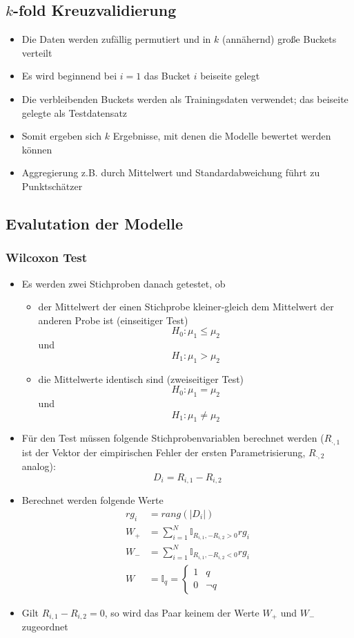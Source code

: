 \documentclass{scrartcl}
\begin{document}
\subsection{$ k $-fold Kreuzvalidierung}

\begin{itemize}
	\item Die Daten werden zufällig permutiert und in $ k $ (annähernd) große 
	Buckets verteilt
	\item Es wird beginnend bei $ i=1 $ das Bucket $ i $ beiseite gelegt
	\item Die verbleibenden Buckets werden als Trainingsdaten verwendet; das 
	beiseite gelegte als Testdatensatz
	\item Somit ergeben sich $ k $ Ergebnisse, mit denen die Modelle bewertet 
	werden können
	\item Aggregierung z.B. durch Mittelwert und Standardabweichung führt zu 
	Punktschätzer
\end{itemize}

\subsection{Evalutation der Modelle}

\subsubsection{Wilcoxon Test}

\begin{itemize}
	\item Es werden zwei Stichproben danach getestet, ob
	\begin{itemize}
		\item der Mittelwert der einen Stichprobe kleiner-gleich dem Mittelwert 
		der anderen Probe ist (einseitiger Test)
		\[ H_0 : \mu_1 \leq \mu_2 \]
		und 
		\[ H_1 : \mu_1 > \mu_2 \]
		\item die Mittelwerte identisch sind (zweiseitiger Test)
		\[ H_0 : \mu_1 = \mu_2 \]
		und
		\[ H_1 : \mu_1 \neq \mu_2 \]
	\end{itemize}
	\item Für den Test müssen folgende Stichprobenvariablen berechnet werden ($ 
	R_{\cdot, 1} $ ist der Vektor der eimpirischen Fehler der ersten 
	Parametrisierung, $ R_{\cdot, 2} $ analog):
	\[ D_i = R_{i,1} - R_{i,2} \]
	\item Berechnet werden folgende Werte
	\begin{align*}
		rg_i &= rang(|D_i|) \\
		W_+ &= \sum_{i=1}^{N} \mathbb{I}_{R_{i,1}, - R_{i,2} > 0} rg_i \\
		W_- &= \sum_{i=1}^{N} \mathbb{I}_{R_{i,1}, - R_{i,2} < 0} rg_i \\
		W &= \mathbb{I}_q = \begin{cases}
			1 & q \\
			0 & \neg q
		\end{cases}
	\end{align*}
	\item Gilt $ R_{i,1} - R_{i,2} = 0 $, so wird das Paar keinem der Werte $ 
	W_+ $ und $ W_- $ zugeordnet
\end{itemize}
\end{document}

